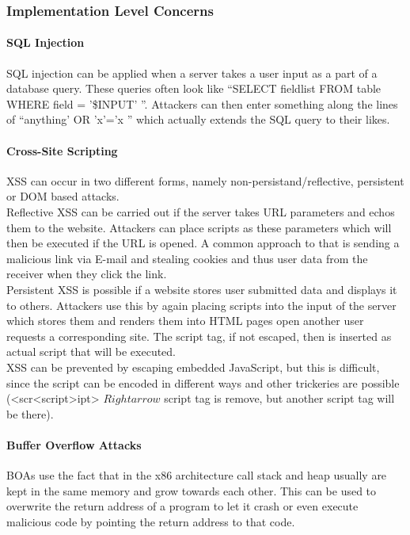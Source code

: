 \subsubsection{Implementation Level Concerns}
\paragraph{SQL Injection}
SQL injection can be applied when a server takes a user input as a part of a database query.
These queries often look like ``SELECT fieldlist FROM table WHERE field = '\$INPUT' ''.
Attackers can then enter something along the lines of ``anything' OR 'x'='x '' which actually extends the SQL query to their likes.

\paragraph{Cross-Site Scripting}
XSS can occur in two different forms, namely non-persistand/reflective, persistent or DOM based attacks.\\
Reflective XSS can be carried out if the server takes URL parameters and echos them to the website.
Attackers can place scripts as these parameters which will then be executed if the URL is opened.
A common approach to that is sending a malicious link via E-mail and stealing cookies and thus user data from the receiver when they click the link.\\
Persistent XSS is possible if a website stores user submitted data and displays it to others.
Attackers use this by again placing scripts into the input of the server which stores them and renders them into HTML pages open another user requests a corresponding site.
The script tag, if not escaped, then is inserted as actual script that will be executed.\\
XSS can be prevented by escaping embedded JavaScript, but this is difficult, since the script can be encoded in different ways and other trickeries are possible (<scr<script>ipt> $Rightarrow$ script tag is remove, but another script tag will be there).

\paragraph{Buffer Overflow Attacks}
BOAs use the fact that in the x86 architecture call stack and heap usually are kept in the same memory and grow towards each other.
This can be used to overwrite the return address of a program to let it crash or even execute malicious code by pointing the return address to that code.


